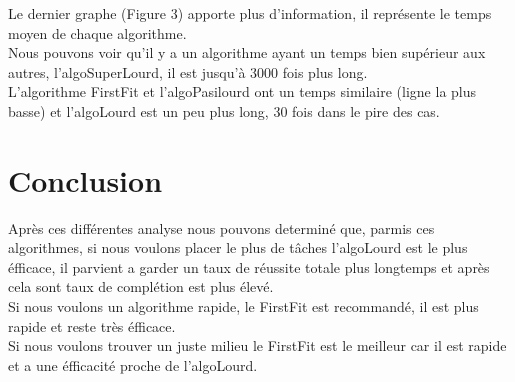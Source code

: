 \documentclass[11pt]{article}
\begin{document}
Le dernier graphe (Figure 3) apporte plus d'information, il représente le temps moyen de chaque algorithme.\\
Nous pouvons voir qu'il y a un algorithme ayant un temps bien supérieur aux autres, l'algoSuperLourd, il est jusqu'à 3000 fois plus long.\\
L'algorithme FirstFit et l'algoPasilourd ont un temps similaire (ligne la plus basse) et l'algoLourd est un peu plus long, 30 fois dans le pire des cas.\\



\section{Conclusion}

Après ces différentes analyse nous pouvons determiné que, parmis ces algorithmes, si nous voulons placer le plus de tâches l'algoLourd est le plus éfficace, il parvient a garder un taux de réussite totale plus longtemps et après cela sont taux de complétion est plus élevé.\\
Si nous voulons un algorithme rapide, le FirstFit est recommandé, il est plus rapide et reste très éfficace. \\
Si nous voulons trouver un juste milieu le FirstFit est le meilleur car il est rapide et a une éfficacité proche de l'algoLourd.\\

\newpage
\end{document}
